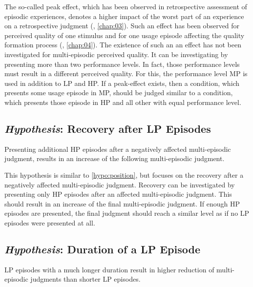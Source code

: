 The so-called peak effect, which has been observed in retrospective assessment of episodic experiences, denotes a higher impact of the worst part of an experience on a retrospective judgment (\cf, \autoref{chap:03}).
Such an effect has been observed for perceived quality of one stimulus and for one usage episode affecting the quality formation process (\cf, \autoref{chap:04}).
The existence of such an an effect has not been investigated for multi-episodic perceived quality.
It can be investigating by presenting more than two performance levels.
In fact, those performance levels must result in a different perceived quality.
For this, the performance level \ac{MP} is used in addition to \ac{LP} and \ac{HP}.
If a peak-effect exists, then a condition, which presents some usage episode in \ac{MP}, should be judged similar to a condition, which presents those episode in \ac{HP} and all other with equal performance level.


\subsection{\emph{Hypothesis}: Recovery after \acs{LP} Episodes}
\begin{hypothesis}\label{hypo:recovery}
Presenting additional \ac{HP} episodes after a negatively affected multi-episodic judgment, results in an increase of the following multi-episodic judgment.
\end{hypothesis}

This hypothesis is similar to \autoref{hypo:position}, but focuses on the recovery after a negatively affected multi-episodic judgment.
Recovery can be investigated by presenting only \ac{HP} episodes after an affected multi-episodic judgment.
This should result in an increase of the final multi-episodic judgment.
If enough \ac{HP} episodes are presented, the final judgment should reach a similar level as if no \ac{LP} episodes were presented at all.

\subsection{\emph{Hypothesis}: Duration of a \acs{LP} Episode}
\begin{hypothesis}\label{hypo:duration}
\ac{LP} episodes with a much longer duration result in higher reduction of multi-episodic judgments than shorter \ac{LP} episodes.
\end{hypothesis}

